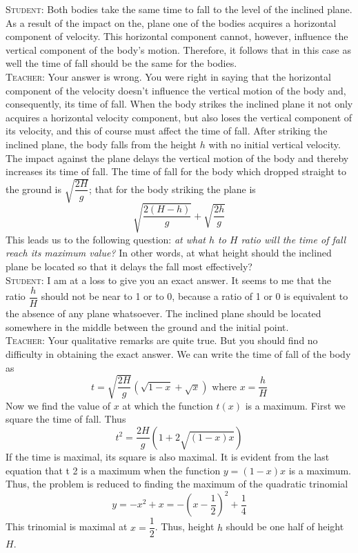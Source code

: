 \documentclass[a4paper,sfsidenotes]{tufte-book}
\begin{document}
\textsc{Student:} Both bodies take the same time to fall to the level of the inclined
plane. As a result of the impact on the, plane one of the bodies acquires a horizontal component of velocity. This horizontal component cannot, however, influence the vertical component of the body's motion. Therefore, it follows that in this case as well the time of fall should be the same for the bodies.
\\
\textsc{Teacher:} Your answer is wrong. You were right in saying that the horizontal component of the velocity doesn't influence the vertical motion of the body and, consequently, its time of
fall. When the body strikes the inclined plane it not only acquires a horizontal velocity component, but also loses the vertical component of its velocity, and this of course must affect the time of fall. After striking the inclined plane, the body falls from the height $h$ with no initial vertical velocity. The impact against the plane delays the vertical motion of the body and thereby increases its time of fall. The time of fall for the body which dropped straight to the ground is $\sqrt{\dfrac{2H}{g}}$; that for the body striking the plane is 
$$
\sqrt{\frac{2 (H-h)}{g}}+\sqrt{\frac{2h}{g}}
$$
This leads us to the following question: \emph{at what $h$ to $H$ ratio will the time of fall reach its maximum value?} In other words, at what height should the inclined plane be located so that it delays the fall most effectively?
\\
\textsc{Student:} I am at a loss to give you an exact answer. It seems to me that the ratio $\dfrac{h}{H}$ should not be near to 1 or to 0, because a ratio of 1 or 0 is equivalent to the absence of any
plane whatsoever. The inclined plane should be located somewhere in the middle between the ground and the initial point.
\\
\textsc{Teacher:} Your qualitative remarks are quite true. But you should find no difficulty in obtaining the exact answer. We can write the time of fall of the body as
$$
t = \sqrt{\frac{2 H}{g}} \left( \sqrt{1-x} + \sqrt{x} \right) \, \, \text{where} \, \, x = \frac{h}{H}
$$
Now we find the value of $x$ at which the function $t(x)$ is a maximum. First we square the time of fall. Thus
$$
t^{2} = \frac{2 H}{g} \left(  1 +2\sqrt{(1-x) x}  \right)
$$
If the time is maximal, its square is also maximal. It is evident from the last equation that t 2 is a maximum when the function $y= (1- x) x$ is a maximum. Thus, the problem is reduced to finding the maximum of the quadratic trinomial 
$$
y = -x^{2} + x = - \left( x- \frac{1}{2}\right)^2 + \frac{1}{4}
$$
This trinomial is maximal at $x= \dfrac{1}{2}$. Thus, height $h$ should be one half of height $H$.
\end{document}
